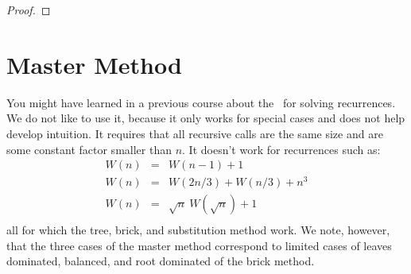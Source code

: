 \begin{flex}
\begin{proof}
\end{proof}
\end{flex}




\section{Master Method}
\label{sec:analysis::recurrences::master-method}

\begin{gram}
You might have learned in a previous course about the~ for solving
recurrences.
%
We do not like to use it, because it only works for special cases and
does not help develop intuition.     
It requires that all recursive calls are the same size and are some
constant factor smaller than $n$.
%
It doesn't work for recurrences such as:
\[
\begin{array}{lcl}
W(n) & = & W(n - 1) + 1 \\
W(n) & = & W(2n / 3) + W(n /3) + n^3\\
W(n) & = & \sqrt{n}~W(\sqrt{n}) + 1\\
\end{array}
\]
all for which the tree, brick, and substitution method work.
%
We note, however, that the three cases of the master method correspond
to limited cases of leaves dominated, balanced, and root dominated of
the brick method.
\end{gram}






